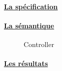     \paragraph{\underline{La spécification\\}}
    
    
    \paragraph{\underline{La sémantique\\}}
    \begin{figure}[!ht]
     \begin{center}
      \caption{Controller}
     \end{center}
    \end{figure}

    \paragraph{\underline{Les résultats\\}}
    
    
